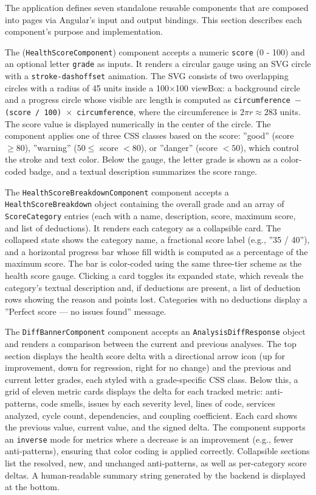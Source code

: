  \par The application defines seven standalone reusable components that are composed into pages via Angular's input and output bindings. This section describes each component's purpose and implementation.

\par The (\texttt{HealthScoreComponent}) component accepts a numeric \texttt{score} (0 - 100) and an optional letter \texttt{grade} as inputs. It renders a circular gauge using an SVG circle with a \texttt{stroke-dashoffset} animation. The SVG consists of two overlapping circles with a radius of 45 units inside a 100$\times$100 viewBox: a background circle and a progress circle whose visible arc length is computed as \texttt{circumference $-$ (score / 100) $\times$ circumference}, where the circumference is $2\pi r \approx 283$ units. The score value is displayed numerically in the center of the circle. The component applies one of three CSS classes based on the score: ''good'' (score $\geq 80$), ''warning'' ($50 \leq$ score $< 80$), or ''danger'' (score $< 50$), which control the stroke and text color. Below the gauge, the letter grade is shown as a color-coded badge, and a textual description summarizes the score range.

\par The \texttt{HealthScoreBreakdownComponent} component accepts a \texttt{Hea\-lth\-Sco\-re\-Break\-down} object containing the overall grade and an array of \texttt{ScoreCategory} entries (each with a name, description, score, maximum score, and list of deductions). It renders each category as a collapsible card. The collapsed state shows the category name, a fractional score label (e.g., ''35 / 40''), and a horizontal progress bar whose fill width is computed as a percentage of the maximum score. The bar is color-coded using the same three-tier scheme as the health score gauge. Clicking a card toggles its expanded state, which reveals the category's textual description and, if deductions are present, a list of deduction rows showing the reason and points lost. Categories with no deductions display a ''Perfect score --- no issues found'' message.

\par The \texttt{DiffBannerComponent} component accepts an \texttt{Analysis\-Diff\-Response} object and renders a comparison between the current and previous analyses. The top section displays the health score delta with a directional arrow icon (up for improvement, down for regression, right for no change) and the previous and current letter grades, each styled with a grade-specific CSS class. Below this, a grid of eleven metric cards displays the delta for each tracked metric: anti-patterns, code smells, issues by each severity level, lines of code, services analyzed, cycle count, dependencies, and coupling coefficient. Each card shows the previous value, current value, and the signed delta. The component supports an \texttt{inverse} mode for metrics where a decrease is an improvement (e.g., fewer anti-patterns), ensuring that color coding is applied correctly. Collapsible sections list the resolved, new, and unchanged anti-patterns, as well as per-category score deltas. A human-readable summary string generated by the backend is displayed at the bottom.

